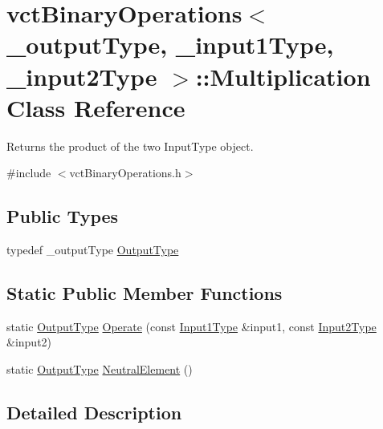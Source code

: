 \hypertarget{classvct_binary_operations_1_1_multiplication}{}\section{vct\+Binary\+Operations$<$ \+\_\+output\+Type, \+\_\+input1\+Type, \+\_\+input2\+Type $>$\+:\+:Multiplication Class Reference}
\label{classvct_binary_operations_1_1_multiplication}


Returns the product of the two Input\+Type object.  




{\ttfamily \#include $<$vct\+Binary\+Operations.\+h$>$}

\subsection*{Public Types}
\begin{DoxyCompactItemize}
\item 
typedef \+\_\+output\+Type \hyperlink{classvct_binary_operations_1_1_multiplication_a54b8e0ebb628e865d7d5221b2b8dc898}{Output\+Type}
\end{DoxyCompactItemize}
\subsection*{Static Public Member Functions}
\begin{DoxyCompactItemize}
\item 
static \hyperlink{classvct_binary_operations_1_1_multiplication_a54b8e0ebb628e865d7d5221b2b8dc898}{Output\+Type} \hyperlink{classvct_binary_operations_1_1_multiplication_a3ff7bb9dae1d65837456aa494a72a516}{Operate} (const \hyperlink{classvct_binary_operations_a5e56a66a012d6a28c539a08a0021c45e}{Input1\+Type} \&input1, const \hyperlink{classvct_binary_operations_a929119af557a04a16b4d854981e49e1b}{Input2\+Type} \&input2)
\item 
static \hyperlink{classvct_binary_operations_1_1_multiplication_a54b8e0ebb628e865d7d5221b2b8dc898}{Output\+Type} \hyperlink{classvct_binary_operations_1_1_multiplication_abcfcc667a31972270bd3fcbc7b08046e}{Neutral\+Element} ()
\end{DoxyCompactItemize}


\subsection{Detailed Description}

